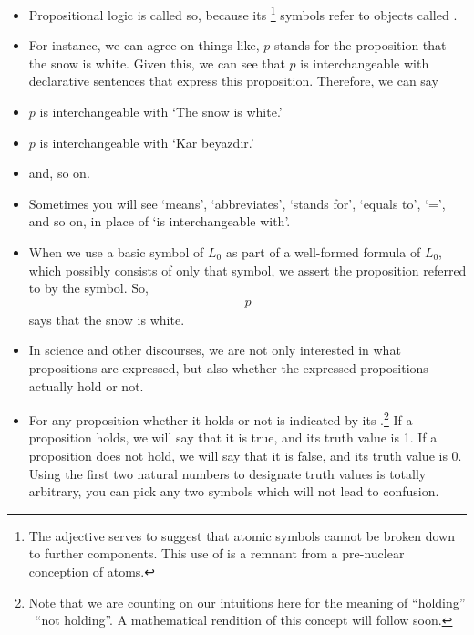 \documentclass[11pt]{article}
\begin{document}
\begin{itemize}

\item Propositional logic is called so, because its \footnote{The
adjective  serves to suggest that atomic symbols  cannot be broken
down to further components. This use of  is a remnant from a
pre-nuclear conception of atoms.} symbols refer to objects called
.

\item For instance, we can agree on things like, $p$ stands for the proposition
that the snow is white.  Given this, we can see that $p$ is interchangeable with
declarative sentences that express this proposition. Therefore, we can say 

\item[] $p$ is interchangeable with `The snow is white.'
\item[] $p$ is interchangeable with `Kar beyazd\i{r}.' 
\item[] and, so on.

\item Sometimes you will see `means', `abbreviates', `stands for', `equals to', `=', and so on, in place of
`is interchangeable with'.

\item When we use a basic symbol of $L_0$ as part of a well-formed formula of $L_0$, which
possibly consists of only that symbol, we assert the proposition referred
to by the symbol. So, 
\begin{align}\label{p}
p
\end{align}
says that the snow is white.

\item In science and other discourses, we are not only interested in
what propositions are expressed, but also whether the expressed propositions actually hold or not.

\item For any proposition whether it holds or not is indicated by its
.\footnote{Note that we are counting on our intuitions here
for the meaning of ``holding'' \versus\ ``not holding''. A mathematical
rendition of this concept will follow soon.} If a proposition holds, we will say
that it is true, and its truth value is 1. If a proposition does not hold, we
will say that it is false, and its truth value is 0. Using the first two natural
numbers to designate truth values is totally arbitrary, you can pick any two symbols which will not lead
to confusion.


\end{itemize}
\end{document}
